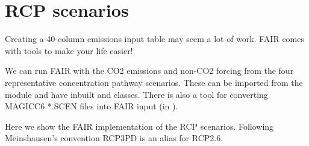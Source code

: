 \documentclass[letterpaper,10pt,english]{sphinxmanual}
\begin{document}
\begin{sphinxVerbatim}[commandchars=\\\{\}]
\end{sphinxVerbatim}

\noindent{}


\section{RCP scenarios}
\label{\detokenize{examples:rcp-scenarios}}
Creating a 40-column emissions input table may seem a lot of work. FAIR
comes with tools to make your life easier!

We can run FAIR with the CO2 emissions and non-CO2 forcing from the four
representative concentration pathway scenarios. These can be imported
from the  module and have inbuilt  and 
classes. There is also a tool for converting MAGICC6 *.SCEN files into
FAIR input (in ).

Here we show the FAIR implementation of the RCP scenarios. Following
Meinshausen's convention RCP3PD is an alias for RCP2.6.
\end{document}
